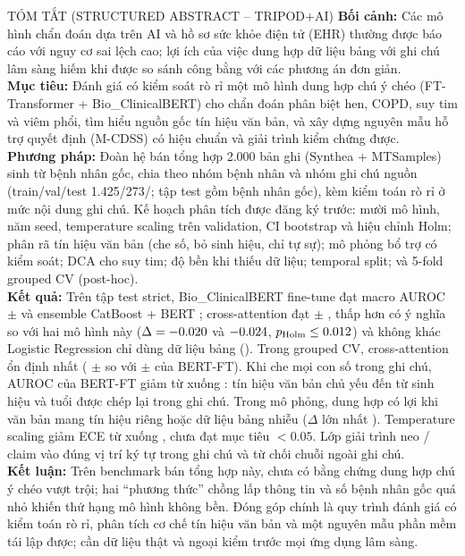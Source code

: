 \begin{clinicalbox}{TÓM TẮT (STRUCTURED ABSTRACT -- TRIPOD+AI)}
\textbf{Bối cảnh:} Các mô hình chẩn đoán dựa trên AI và hồ sơ sức khỏe điện tử (EHR) thường được báo cáo với nguy cơ sai lệch cao; lợi ích của việc dung hợp dữ liệu bảng với ghi chú lâm sàng hiếm khi được so sánh công bằng với các phương án đơn giản. \\[0.4em]
\textbf{Mục tiêu:} Đánh giá có kiểm soát rò rỉ một mô hình dung hợp chú ý chéo (FT-Transformer + Bio\_ClinicalBERT) cho chẩn đoán phân biệt hen, COPD, suy tim và viêm phổi, tìm hiểu nguồn gốc tín hiệu văn bản, và xây dựng nguyên mẫu hỗ trợ quyết định (M-CDSS) có hiệu chuẩn và giải trình kiểm chứng được. \\[0.4em]
\textbf{Phương pháp:} Đoàn hệ bán tổng hợp 2.000 bản ghi (Synthea + MTSamples) sinh từ \allSourcePatients{} bệnh nhân gốc, chia theo nhóm bệnh nhân và nhóm ghi chú nguồn (train/val/test 1.425/273/\testN; tập test gồm \testSourcePatients{} bệnh nhân gốc), kèm kiểm toán rò rỉ ở mức nội dung ghi chú. Kế hoạch phân tích được đăng ký trước: mười mô hình, năm seed, temperature scaling trên validation, CI bootstrap và hiệu chỉnh Holm; phân rã tín hiệu văn bản (che số, bỏ sinh hiệu, chỉ tự sự); mô phỏng bổ trợ có kiểm soát; DCA cho suy tim; độ bền khi thiếu dữ liệu; temporal split; và 5-fold grouped CV (post-hoc). \\[0.4em]
\textbf{Kết quả:} Trên tập test strict, Bio\_ClinicalBERT fine-tune đạt macro AUROC \aucBertFT{} $\pm$ \aucsdBertFT{} và ensemble CatBoost + BERT \aucEnsemble{}; cross-attention đạt \aucXattn{} $\pm$ \aucsdXattn{}, thấp hơn có ý nghĩa so với hai mô hình này ($\Delta=-0.020$ và $-0.024$, $p_{\text{Holm}}\le0.012$) và không khác Logistic Regression chỉ dùng dữ liệu bảng (\aucLRTab). Trong grouped CV, cross-attention ổn định nhất (\cvXattn{} $\pm$ \cvsdXattn{} so với \cvBertFT{} $\pm$ \cvsdBertFT{} của BERT-FT). Khi che mọi con số trong ghi chú, AUROC của BERT-FT giảm từ \rqtwoBertFTFull{} xuống \rqtwoBertFTNumMasked{}: tín hiệu văn bản chủ yếu đến từ sinh hiệu và tuổi được chép lại trong ghi chú. Trong mô phỏng, dung hợp có lợi khi văn bản mang tín hiệu riêng hoặc dữ liệu bảng nhiễu ($\Delta$ lớn nhất \rqthreeBestDelta). Temperature scaling giảm ECE từ \eceUncal{} xuống \eceTemp{}, chưa đạt mục tiêu $<0.05$. Lớp giải trình neo \ragGrounded/\ragClaims{} claim vào đúng vị trí ký tự trong ghi chú và từ chối \ragProbes{} chuỗi ngoài ghi chú. \\[0.4em]
\textbf{Kết luận:} Trên benchmark bán tổng hợp này, chưa có bằng chứng dung hợp chú ý chéo vượt trội; hai ``phương thức'' chồng lấp thông tin và số bệnh nhân gốc quá nhỏ khiến thứ hạng mô hình không bền. Đóng góp chính là quy trình đánh giá có kiểm toán rò rỉ, phân tích cơ chế tín hiệu văn bản và một nguyên mẫu phần mềm tái lập được; cần dữ liệu thật và ngoại kiểm trước mọi ứng dụng lâm sàng.
\end{clinicalbox}
